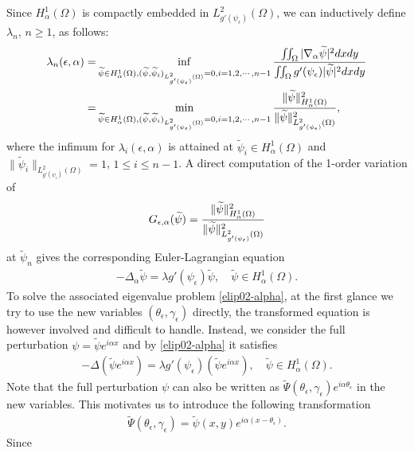 \documentclass[1 [leqno, 11pt]{amsart}
\numberwithin{equation}{section}
\let\ep=\epsilon
\begin{document}
\begin{CJK*}{GBK}{song}
Since  $H_\alpha^{1}(\Omega)$ is compactly embedded in $L_{g'(\psi_\ep)}^2(\Omega)$,
 we can
inductively define $\lambda_n$, $n\geq1$, as follows:
\begin{align}\nonumber
\lambda_n(\ep,\alpha)=& \inf_{\widetilde{\psi} \in H_\alpha^{1}(\Omega), (\widetilde{\psi}, \widetilde{\psi}_{i})_{L_{g'(\psi_\ep)}^2(\Omega)} = 0, i = 1, 2, \cdots, n-1}{\iint_\Omega|\nabla_\alpha\widetilde{\psi}|^2dxdy\over\iint_\Omega g'(\psi_\ep)|\widetilde{\psi}|^2dxdy}\\\nonumber
=&\min_{\widetilde{\psi} \in H_\alpha^{1}(\Omega), (\widetilde{\psi}, \widetilde{\psi}_{i})_{L_{g'(\psi_\ep)}^2(\Omega)} = 0, i = 1, 2, \cdots, n-1}{\|\widetilde{\psi}\|_{H_\alpha^{1}(\Omega)}^2\over\|\widetilde{\psi}\|_{L_{g'(\psi_\ep)}^2(\Omega)}^2},
\end{align}
where the infimum for $\lambda_i(\ep,\alpha)$ is attained at  $\widetilde\psi_{i} \in H_\alpha^{1}(\Omega)$ and $\|\widetilde{\psi}_i\|_{L_{g'(\psi_\ep)}^2(\Omega)} = 1$, $1\leq i \leq n-1$.
A direct computation of the 1-order variation of $$G_{\ep,\alpha}(\widetilde{\psi})={\|\widetilde{\psi}\|_{H_\alpha^{1}(\Omega)}^2\over\|\widetilde{\psi}\|_{L_{g'(\psi_\ep)}^2(\Omega)}^2}$$
 at $\widetilde{\psi}_{n}$ gives
the corresponding Euler-Lagrangian equation
\begin{align}\label{elip02-alpha}
-\Delta_\alpha \widetilde\psi = \lambda g'(\psi_\ep)\widetilde\psi, \quad \widetilde\psi \in H_\alpha^{1}(\Omega).
\end{align}
To solve the associated eigenvalue problem \eqref{elip02-alpha}, at the first glance we try to use the new variables $(\theta_\ep,\gamma_\ep)$ directly, the transformed equation is however involved and difficult to handle. Instead, we consider  the full perturbation $\psi=\widetilde\psi e^{i\alpha x}$ and by  \eqref{elip02-alpha} it  satisfies
\begin{align}\label{elip02-alpha-full perturbation}
-\Delta(\widetilde\psi e^{i\alpha x}) = \lambda g'(\psi_\ep)(\widetilde\psi e^{i\alpha x}), \quad \widetilde\psi \in H_\alpha^{1}(\Omega).
\end{align}
Note that the full perturbation $\psi$ can also be written as $\widetilde\Psi(\theta_\ep,\gamma_\ep) e^{i\alpha \theta_\ep}$ in the new variables. This motivates us to introduce the following transformation
\begin{align}\label{transformation-modu}
\widetilde\Psi(\theta_\ep,\gamma_\ep)=\widetilde\psi(x,y) e^{i\alpha (x-\theta_\ep)}.
\end{align}
Since

\end{CJK*}
\end{document}
